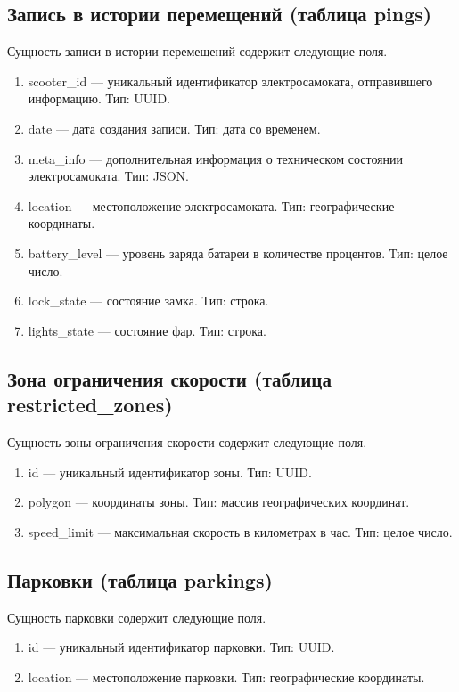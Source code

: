 \subsection{Запись в истории перемещений (таблица pings)}

Сущность записи в истории перемещений содержит следующие поля.

\begin{enumerate}
	\item scooter\_id --- уникальный идентификатор электросамоката, отправившего
	      информацию. Тип: UUID.
	\item date --- дата создания записи. Тип: дата со временем.
	\item meta\_info --- дополнительная информация о техническом состоянии
	      электросамоката. Тип: JSON.
	\item location --- местоположение электросамоката. Тип: географические координаты.
	\item battery\_level --- уровень заряда батареи в количестве процентов. Тип: целое
	      число.
	\item lock\_state --- состояние замка. Тип: строка.
	\item lights\_state --- состояние фар. Тип: строка.
\end{enumerate}

\subsection{Зона ограничения скорости (таблица restricted\_zones)}

Сущность зоны ограничения скорости содержит следующие поля.

\begin{enumerate}
	\item id --- уникальный идентификатор зоны. Тип: UUID.
	\item polygon --- координаты зоны. Тип: массив географических координат.
	\item speed\_limit --- максимальная скорость в километрах в час. Тип: целое число.
\end{enumerate}

\subsection{Парковки (таблица parkings)}

Сущность парковки содержит следующие поля.

\begin{enumerate}
	\item id --- уникальный идентификатор парковки. Тип: UUID.
	\item location --- местоположение парковки. Тип: географические координаты.
\end{enumerate}

